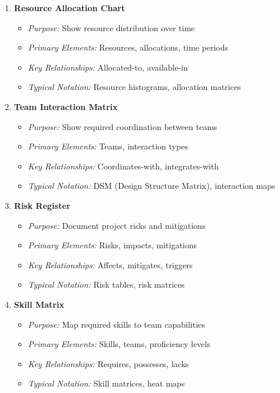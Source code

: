 \documentclass[11pt,letterpaper]{article}
\begin{document}
\begin{enumerate}[label=\textbf{MT\arabic*:}, leftmargin=2.5em]
    \item \textbf{Resource Allocation Chart}
    \begin{itemize}[nosep]
        \item \textit{Purpose:} Show resource distribution over time
        \item \textit{Primary Elements:} Resources, allocations, time periods
        \item \textit{Key Relationships:} Allocated-to, available-in
        \item \textit{Typical Notation:} Resource histograms, allocation matrices
    \end{itemize}
    
    \item \textbf{Team Interaction Matrix}
    \begin{itemize}[nosep]
        \item \textit{Purpose:} Show required coordination between teams
        \item \textit{Primary Elements:} Teams, interaction types
        \item \textit{Key Relationships:} Coordinates-with, integrates-with
        \item \textit{Typical Notation:} DSM (Design Structure Matrix), interaction maps
    \end{itemize}
    
    \item \textbf{Risk Register}
    \begin{itemize}[nosep]
        \item \textit{Purpose:} Document project risks and mitigations
        \item \textit{Primary Elements:} Risks, impacts, mitigations
        \item \textit{Key Relationships:} Affects, mitigates, triggers
        \item \textit{Typical Notation:} Risk tables, risk matrices
    \end{itemize}
    
    \item \textbf{Skill Matrix}
    \begin{itemize}[nosep]
        \item \textit{Purpose:} Map required skills to team capabilities
        \item \textit{Primary Elements:} Skills, teams, proficiency levels
        \item \textit{Key Relationships:} Requires, possesses, lacks
        \item \textit{Typical Notation:} Skill matrices, heat maps
    \end{itemize}
    

\end{enumerate}
\end{document}
